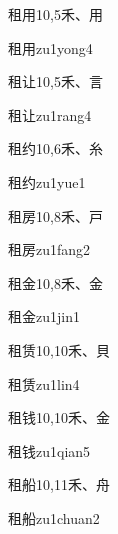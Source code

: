 \begin{entry}{租用}{10,5}{⽲、⽤}
  \begin{phonetics}{租用}{zu1yong4}
  \end{phonetics}
\end{entry}

\begin{entry}{租让}{10,5}{⽲、⾔}
  \begin{phonetics}{租让}{zu1rang4}
  \end{phonetics}
\end{entry}

\begin{entry}{租约}{10,6}{⽲、⽷}
  \begin{phonetics}{租约}{zu1yue1}
  \end{phonetics}
\end{entry}

\begin{entry}{租房}{10,8}{⽲、⼾}
  \begin{phonetics}{租房}{zu1fang2}
  \end{phonetics}
\end{entry}

\begin{entry}{租金}{10,8}{⽲、⾦}
  \begin{phonetics}{租金}{zu1jin1}
  \end{phonetics}
\end{entry}

\begin{entry}{租赁}{10,10}{⽲、⾙}
  \begin{phonetics}{租赁}{zu1lin4}
  \end{phonetics}
\end{entry}

\begin{entry}{租钱}{10,10}{⽲、⾦}
  \begin{phonetics}{租钱}{zu1qian5}
  \end{phonetics}
\end{entry}

\begin{entry}{租船}{10,11}{⽲、⾈}
  \begin{phonetics}{租船}{zu1chuan2}
  \end{phonetics}
\end{entry}


